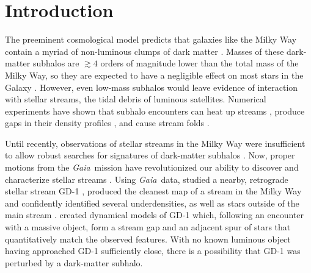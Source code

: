 \documentclass[twocolumn]{aastex63}
\newcommand{\gaia}{\textsl{Gaia}}
\begin{document}

\section{Introduction}
\label{sec:intro}

The preeminent cosmological model predicts that galaxies like the Milky Way contain a myriad of non-luminous clumps of dark matter \citep[e.g.,][]{diemand2008, springel2008}.
Masses of these dark-matter subhalos are $\gtrsim4$ orders of magnitude lower than the total mass of the Milky Way, so they are expected to have a negligible effect on most stars in the Galaxy \citep[e.g.,][]{hopkins2008, donghia2010}.
However, even low-mass subhalos would leave evidence of interaction with stellar streams, the tidal debris of luminous satellites.
Numerical experiments have shown that subhalo encounters can heat up streams \citep[e.g.,][]{johnston2002, ibata2002}, produce gaps in their density profiles \citep[e.g.,][]{sgv2008,yoon2011}, and cause stream folds \citep[e.g.,][]{carlberg2009}.

Until recently, observations of stellar streams in the Milky Way were insufficient to allow robust searches for signatures of dark-matter subhalos \citep[cf.][]{carlberg2012, ibata2016}.
Now, proper motions from the \gaia\ mission \citep{gdr2} have revolutionized our ability to discover \citep[e.g.,][]{malhan2018,meingast2019} and characterize stellar streams \citep[e.g.,][]{bonaca2019b,shipp2019}.
Using \gaia\ data, \citet{pwb} studied a nearby, retrograde stellar stream GD-1 \citep{grillmair2006}, produced the cleanest map of a stream in the Milky Way and confidently identified several underdensities, as well as stars outside of the main stream \citep[see also][]{malhan2019b, deboer2019}.
\citet{bonaca2019a} created dynamical models of GD-1 which, following an encounter with a massive object, form a stream gap and an adjacent spur of stars that  quantitatively match the observed features.
With no known luminous object having approached GD-1 sufficiently close, there is a possibility that GD-1 was perturbed by a dark-matter subhalo.
\end{document}
